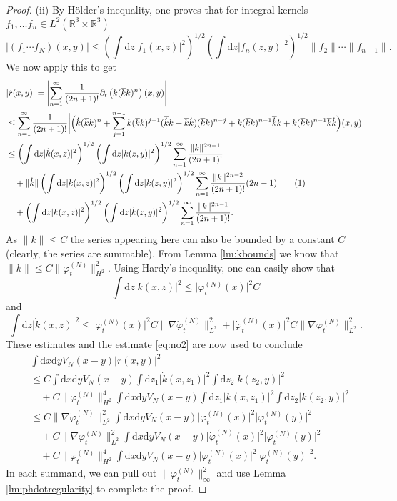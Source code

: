 \documentclass[11pt,a4paper,draft,DIV11]{scrartcl}	%
\newcommand{\di}{\textrm{d}}		%
\newcommand{\cc}[1]{\overline{#1}}	%
\newcommand{\Rbb}{\mathbb{R}}		%
\newcommand{\norm}[1]{\lVert#1\rVert}	%
\newcommand{\ph}{\varphi_t^{(N)}}	%
\newcommand{\phdot}{\dot{\varphi}_t^{(N)}}	%
\newcommand{\bd}{\begin{displaymath}}			%
\newcommand{\ed}{\end{displaymath}}
\newcommand{\tagg}[1]{ \stepcounter{equation} \tag{\theequation} \label{eq:#1} } %
\newcommand{\eqr}[1]{\eqref{eq:#1}}			%
\begin{document}
\begin{proof}
(ii) By H\"older's inequality, one proves that for integral kernels $f_1, \dots f_n \in L^2(\Rbb^3\times\Rbb^3)$
\[
\lvert (f_1 \cdots f_N)(x,y)\rvert \leq \left( \int \di z \lvert f_1(x,z)\rvert^2 \right)^{1/2} \left( \int \di z \lvert f_n(z,y)\rvert^2\right)^{1/2} \norm{f_2} \cdots \norm{f_{n-1}}.
\]
We now apply this to get
\begin{align*}
& \lvert \dot r(x,y) \rvert = \left\lvert \sum_{n=1}^\infty \frac{1}{(2n+1)!} \partial_t \left(k(\cc k k)^n \right)(x,y)\right\rvert \\
& \leq \sum_{n=1}^\infty \frac{1}{(2n+1)!} \bigg\lvert\Big( \dot k(\cc k k)^n + \sum_{j=1}^{n-1} k(\cc k k)^{j-1}(\cc{\dot k}k + \cc k \dot k)(\cc k k)^{n-j} + k (\cc k k)^{n-1} \cc{\dot k} k + k(\cc{k}k)^{n-1}\cc{k}\dot k \Big)(x,y)\bigg\rvert \\
& \leq \left(\int \di z \lvert \dot k(x,z)\rvert^2 \right)^{1/2} \left( \int \di z \lvert k(z,y)\rvert^2 \right)^{1/2} \sum_{n=1}^\infty \frac{\norm{k}^{2n-1}}{(2n+1)!} \\
& \quad + \norm{\dot k} \left( \int \di z \lvert k(x,z)\rvert^2 \right)^{1/2} \left( \int \di z \lvert k(z,y)\rvert^2 \right)^{1/2} \sum_{n=1}^\infty \frac{\norm{k}^{2n-2}}{(2n+1)!} (2n-1) \tagg{no2}\\
& \quad + \left( \int \di z \lvert k(x,z)\rvert^2 \right)^{1/2} \left( \int \di z \lvert \dot k(z,y)\rvert^2 \right)^{1/2} \sum_{n=1}^\infty \frac{\norm{k}^{2n-1}}{(2n+1)!}.
\end{align*}
As $\norm{k} \leq C$ the series appearing here can also be bounded by a constant $C$ (clearly, the series are summable). From Lemma \ref{lm:kbounds} we know that $\norm{\dot k} \leq C \norm{\ph}_{H^2}^2$. Using Hardy's inequality, one can easily show that
\bd
\int \di z \lvert k(x,z)\rvert^2 \leq \lvert \ph(x)\rvert^2 C
\ed
and
\bd
\int \di z \lvert \dot k(x,z)\rvert^2 \leq \lvert \ph(x)\rvert^2 C \norm{\nabla \phdot}_{L^2}^2 + \lvert \phdot(x)\rvert^2 C \norm{\nabla \ph}_{L^2}^2.
\ed
These estimates and the estimate \eqr{no2} are now used to conclude
\begin{align*}
& \int \di x \di y V_N(x-y) \lvert \dot r(x,y)\rvert^2 \\
& \leq C \int \di x \di y V_N(x-y) \int \di z_1 \lvert \dot k(x,z_1)\rvert^2 \int \di z_2 \lvert k(z_2,y)\rvert^2 \\
& \quad + C \norm{\ph}_{H^2}^4 \int \di x \di y V_N(x-y) \int \di z_1 \lvert k(x,z_1)\rvert^2 \int \di z_2 \lvert k(z_2,y)\rvert^2 \\
& \leq C \norm{\nabla \phdot}_{L^2}^2 \int \di x \di y V_N(x-y) \lvert \ph(x)\rvert^2 \lvert \ph(y)\rvert^2 \\
& \quad + C \norm{\nabla \ph}_{L^2}^2 \int \di x \di y V_N(x-y) \lvert \phdot(x)\rvert^2 \lvert \ph(y)\rvert^2 \\
& \quad + C \norm{\ph}_{H^2}^4 \int \di x \di y V_N(x-y) \lvert \ph(x)\rvert^2 \lvert \ph(y)\rvert^2.
\end{align*}
In each summand, we can pull out $\norm{\ph}_\infty^2$ and use Lemma \ref{lm:phdotregularity} to complete the proof.
\end{proof}
\end{document}
